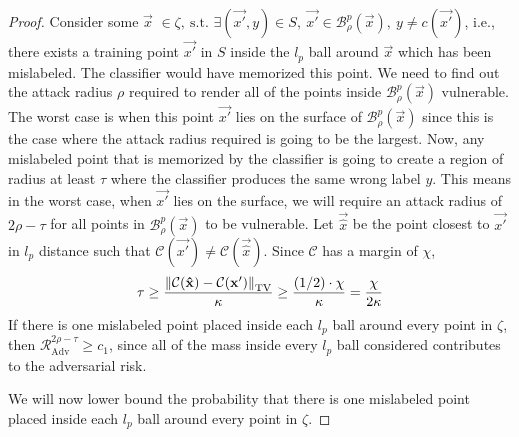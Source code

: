 \documentclass{ociamthesis}
\begin{document}
\begin{proof}
Consider some $\vec{x}$
$
\in \zeta, ~\text{s.t. } \exists (\vec{x'}, y) \in S,~\vec{x'}
\in \mathcal{B}_\rho^p(\vec{x}),~y \neq c(\vec{x'})
$,
i.e., there exists a training point $\vec{x'}$ in $S$ inside the $l_p$ ball
around $\vec{x}$ which has been mislabeled. The classifier would have memorized
this point. We need to find out the attack radius $\rho$ required to render all
of the points inside $\mathcal{B}_\rho^p(\vec{x})$ vulnerable. The worst case is
when this point $\vec{x'}$ lies on the surface of $\mathcal{B}_\rho^p(\vec{x})$
since this is the case where the attack radius required is going to be the
largest. Now, any mislabeled point that is memorized by the classifier is going
to create a region of radius at least $\tau$ where the classifier produces the
same wrong label $y$. This means in the worst case, when $\vec{x'}$ lies on the
surface, we will require an attack radius of $2\rho-\tau$ for all points in
$\mathcal{B}_\rho^p(\vec{x})$ to be vulnerable. Let $\vec{\hat{x}}$ be the point
closest to $\vec{x'}$ in $l_p$ distance such that $\mathcal{C}(\vec{x'}) \neq
\mathcal{C}(\vec{\hat{x}})$. Since $\mathcal{C}$ has a margin of $\chi$,
\begin{equation*}
    \tau \geq \frac{\mathrm{\left\lVert\mathcal{C}({\mathbf{\hat{x}}}) - \mathcal{C}({\mathbf{x'}})
                \right\rVert}_\text{TV}}
                    {\kappa}
        \geq
        \frac{(1/2)\cdot\chi}{\kappa} = 
        \frac{\chi}{2\kappa}
\end{equation*}
If there is one mislabeled point placed inside each $l_p$ ball around every
point in $\zeta$, then $\mathcal{R}_{\text{Adv}}^{2\rho-\tau} \geq c_1$, since
all of the mass inside every $l_p$ ball considered contributes to the
adversarial risk.

We will now lower bound the probability that there is one mislabeled point
placed inside each $l_p$ ball around every point in $\zeta$.


\end{proof}
\end{document}
